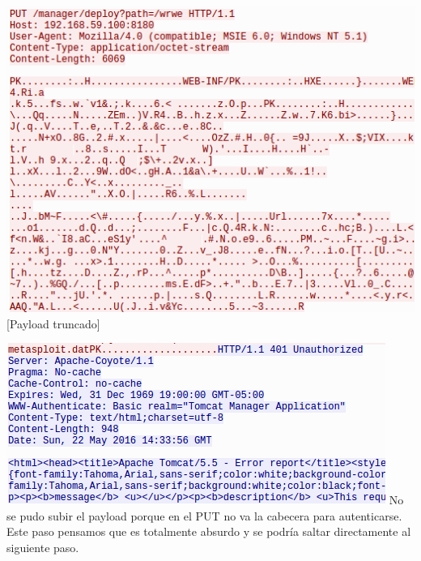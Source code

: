 \documentclass[a4paper,12pt]{scrartcl}
\begin{document}
\begin{center}
	\includegraphics[width=1\linewidth]{cap3-1}
	[Payload truncado]
\end{center}
\begin{center}
	\includegraphics[width=1\linewidth]{cap3-2}
	No se pudo subir el payload porque en el PUT no va la cabecera para autenticarse. Este paso pensamos que es totalmente absurdo y se podría saltar directamente al siguiente paso.
\end{center}

\newpage
\end{document}
